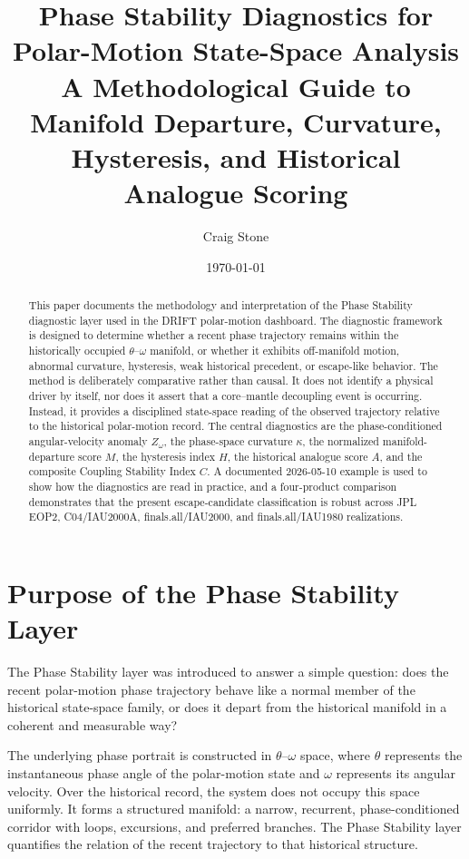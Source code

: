 \documentclass[11pt]{article}
\title{\textbf{Phase Stability Diagnostics for Polar-Motion State-Space Analysis}\\\large A Methodological Guide to Manifold Departure, Curvature, Hysteresis, and Historical Analogue Scoring}
\author{Craig Stone}
\date{\today}
\begin{document}
\maketitle

\begin{abstract}
This paper documents the methodology and interpretation of the Phase Stability diagnostic layer used in the DRIFT polar-motion dashboard. The diagnostic framework is designed to determine whether a recent phase trajectory remains within the historically occupied \(\theta\)--\(\omega\) manifold, or whether it exhibits off-manifold motion, abnormal curvature, hysteresis, weak historical precedent, or escape-like behavior. The method is deliberately comparative rather than causal. It does not identify a physical driver by itself, nor does it assert that a core--mantle decoupling event is occurring. Instead, it provides a disciplined state-space reading of the observed trajectory relative to the historical polar-motion record. The central diagnostics are the phase-conditioned angular-velocity anomaly \(Z_{\omega}\), the phase-space curvature \(\kappa\), the normalized manifold-departure score \(M\), the hysteresis index \(H\), the historical analogue score \(A\), and the composite Coupling Stability Index \(C\). A documented 2026-05-10 example is used to show how the diagnostics are read in practice, and a four-product comparison demonstrates that the present escape-candidate classification is robust across JPL EOP2, C04/IAU2000A, finals.all/IAU2000, and finals.all/IAU1980 realizations.
\end{abstract}

\section{Purpose of the Phase Stability Layer}

The Phase Stability layer was introduced to answer a simple question: does the recent polar-motion phase trajectory behave like a normal member of the historical state-space family, or does it depart from the historical manifold in a coherent and measurable way?

The underlying phase portrait is constructed in \(\theta\)--\(\omega\) space, where \(\theta\) represents the instantaneous phase angle of the polar-motion state and \(\omega\) represents its angular velocity. Over the historical record, the system does not occupy this space uniformly. It forms a structured manifold: a narrow, recurrent, phase-conditioned corridor with loops, excursions, and preferred branches. The Phase Stability layer quantifies the relation of the recent trajectory to that historical structure.
\end{document}
